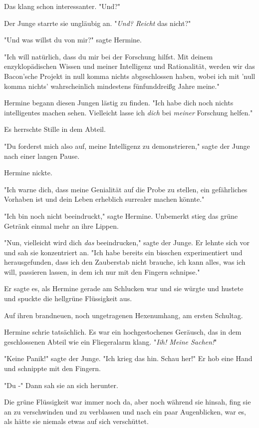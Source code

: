 {Das klang schon interessanter. "Und?"

Der Junge starrte sie ungläubig an. "\emph{Und? Reicht} das nicht?"

"Und was willst du von mir?" sagte Hermine.

"Ich will natürlich, dass du mir bei der Forschung hilfst. Mit deinem enzyklopädischen Wissen und meiner Intelligenz und Rationalität, werden wir das Bacon'sche Projekt in null komma nichts abgeschlossen haben, wobei ich mit 'null komma nichts' wahrscheinlich mindestens fünfunddreißg Jahre meine."

Hermine begann diesen Jungen lästig zu finden. "Ich habe dich noch nichts intelligentes machen sehen. Vielleicht lasse ich \emph{dich} bei \emph{meiner} Forschung helfen."

Es herrschte Stille in dem Abteil.

"Du forderst mich also auf, meine Intelligenz zu demonstrieren," sagte der Junge nach einer langen Pause.

Hermine nickte.

"Ich warne dich, dass meine Genialität auf die Probe zu stellen, ein gefährliches Vorhaben ist und dein Leben erheblich surrealer machen könnte."

"Ich bin noch nicht beeindruckt," sagte Hermine. Unbemerkt stieg das grüne Getränk einmal mehr an ihre Lippen.

"Nun, vielleicht wird dich \emph{das} beeindrucken," sagte der Junge. Er lehnte sich vor und sah sie konzentriert an. "Ich habe bereits ein bisschen experimentiert und herausgefunden, dass ich den Zauberstab nicht brauche, ich kann alles, was ich will, passieren lassen, in dem ich nur mit den Fingern schnipse."

Er sagte es, als Hermine gerade am Schlucken war und sie würgte und hustete und spuckte die hellgrüne Flüssigkeit aus.

Auf ihren brandneuen, noch ungetragenen Hexenumhang, am ersten Schultag.

Hermine schrie tatsächlich. Es war ein hochgestochenes Geräusch, das in dem geschlossenen Abteil wie ein Fliegeralarm klang. "\emph{Iih! Meine Sachen!}"

"Keine Panik!" sagte der Junge. "Ich krieg das hin. Schau her!" Er hob eine Hand und schnippte mit den Fingern.

"Du -" Dann sah sie an sich herunter.

Die grüne Flüssigkeit war immer noch da, aber noch während sie hinsah, fing sie an zu verschwinden und zu verblassen und nach ein paar Augenblicken, war es, als hätte sie niemals etwas auf sich verschüttet.

}
